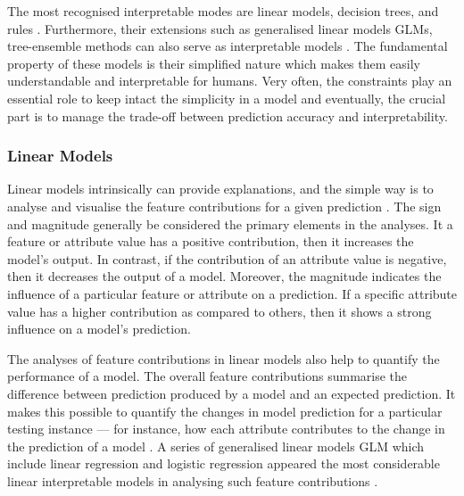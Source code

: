 \documentclass[english]{tktltiki2}
\theoremstyle{definition}
\theoremstyle{remark}
\begin{document}
The most recognised interpretable modes are linear models, decision trees, and rules \citep{molnarinterpretable, guidotti2018survey, murdoch2019interpretable}. Furthermore, their extensions such as generalised linear models GLMs, tree-ensemble methods can also serve as interpretable models \citep{molnarinterpretable, murdoch2019interpretable}. The fundamental property of these models is their simplified nature which makes them easily understandable and interpretable for humans. Very often, the constraints play an essential role to keep intact the simplicity in a model and eventually, the crucial part is to manage the trade-off between prediction accuracy and interpretability.


\subsubsection{Linear Models}
Linear models intrinsically can provide explanations, and the simple way is to analyse and visualise the feature contributions for a given prediction \citep{molnarinterpretable, guidotti2018survey}. The sign and magnitude generally be considered the primary elements in the analyses. It a feature or attribute value has a positive contribution, then it increases the model’s output. In contrast, if the contribution of an attribute value is negative, then it decreases the output of a model. Moreover, the magnitude indicates the influence of a particular feature or attribute on a prediction. If a specific attribute value has a higher contribution as compared to others, then it shows a strong influence on a model’s prediction. 


The analyses of feature contributions in linear models also help to quantify the performance of a model. The overall feature contributions summarise the difference between prediction produced by a model and an expected prediction. It makes this possible to quantify the changes in model prediction for a particular testing instance — for instance, how each attribute contributes to the change in the prediction of a model \citep{molnarinterpretable, honegger2018shedding}. A series of generalised linear models GLM which include linear regression and logistic regression appeared the most considerable linear interpretable models in analysing such feature contributions \citep{murdoch2019interpretable}. 
\end{document}
